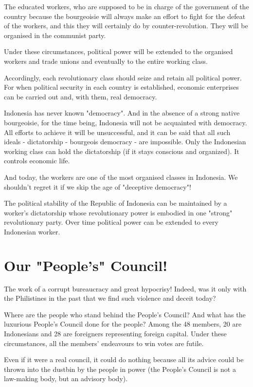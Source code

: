 The educated workers, who are supposed to be in charge of the government of the country because the 
bourgeoisie will always make an effort to fight for the defeat of the workers, and this they will certainly do 
by counter-revolution. They will be organised in the communist party.\nline

Under these circumstances, political power will be extended to the organised workers and trade unions and eventually to the entire working class.\nline

Accordingly, each revolutionary class should seize and retain all political power. For when political security in each 
country is established, economic enterprises can be carried out and, with them, real democracy.\nline

Indonesia has never known "democracy". And in the absence of a strong native bourgeoisie, for the time being, 
Indonesia will not be acquainted with democracy. All efforts to achieve it will be unsuccessful, and it can be said 
that all such ideals - dictatorship - bourgeois democracy - are impossible. Only the Indonesian working class can 
hold the dictatorship (if it stays conscious and organized). It controls economic life.\nline

And today, the workers are one of the most organised classes in Indonesia. We shouldn't regret it if we skip the age of "deceptive democracy"!\nline

The political stability of the Republic of Indonesia can be maintained by a worker's dictatorship whose 
revolutionary power is embodied in one "strong" revolutionary party. Over time political power can be extended to every Indonesian worker.\nline

\section{Our "People's" Council!}

The work of a corrupt bureaucracy and great hypocrisy! Indeed, was it only with the Philistines in the past that we find such violence and deceit today?\nline

Where are the people who stand behind the People's Council? And what has the luxurious People's Council done for 
the people? Among the 48 members, 20 are Indonesians and 28 are foreigners representing foreign capital. Under 
these circumstances, all the members' endeavours to win votes are futile.\nline

Even if it were a real council, it could do nothing because all its advice could be thrown into the dustbin by the people in power (the People's Council is not a law-making body, but an advisory body).\nline

